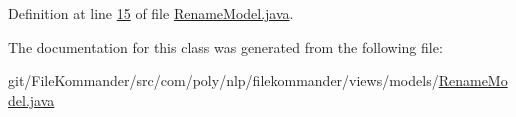 Definition at line \hyperlink{L15}{15} of file \hyperlink{}{Rename\-Model.\-java}.



The documentation for this class was generated from the following file\-:\begin{DoxyCompactItemize}
\item 
git/\-File\-Kommander/src/com/poly/nlp/filekommander/views/models/\hyperlink{_rename_model_8java}{Rename\-Model.\-java}\end{DoxyCompactItemize}
